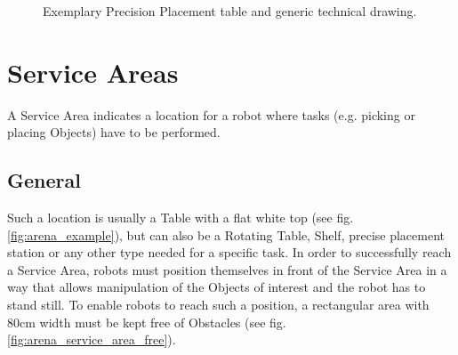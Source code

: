 \begin{figure}[h!]
	\centering
	\hspace{0.05\textwidth}
	\caption{Exemplary Precision Placement table and generic technical drawing.}%
	\label{fig:ppt_table}
\end{figure}

\clearpage

\section{Service Areas}
\label{sec:Service_Areas}
A Service Area indicates a location for a robot where tasks (e.g. picking or placing Objects) have to be performed.
\subsection{General} 
\label{subsec:Service_Areas_General}


Such a location is usually a Table with a flat white top (see fig. \ref{fig:arena_example}), but can also be a Rotating Table, Shelf, precise placement station or any other type needed for a specific task.
In order to successfully reach a Service Area, robots must position themselves in front of the Service Area in a way that allows manipulation of the Objects of interest and the robot has to stand still. To enable robots to reach such a position, a rectangular area with $80\si{\centi\meter}$ width must be kept free of Obstacles (see fig. \ref{fig:arena_service_area_free}). 


